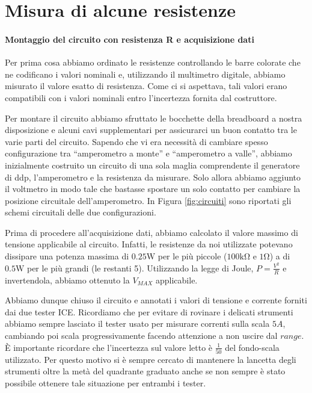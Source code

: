 \section{Misura di alcune resistenze}
\paragraph{Montaggio del circuito con resistenza R e acquisizione dati\\}
Per prima cosa abbiamo ordinato le resistenze controllando le barre colorate che ne codificano  i valori nominali e, utilizzando il multimetro digitale, abbiamo misurato il valore esatto di resistenza. Come ci si aspettava, tali valori erano compatibili con i valori nominali entro l'incertezza fornita dal costruttore.

Per montare il circuito abbiamo sfruttato le bocchette della breadboard a nostra disposizione e alcuni cavi supplementari per assicurarci un buon contatto tra le varie parti del circuito.
Sapendo che vi era necessità di cambiare spesso configurazione tra ``amperometro a monte'' e ``amperometro a valle'', abbiamo inizialmente costruito un circuito di una sola maglia comprendente il generatore di ddp, l'amperometro e la resistenza da misurare. 
Solo allora abbiamo aggiunto il voltmetro in modo tale che bastasse spostare un solo contatto per cambiare la posizione circuitale dell'amperometro. In Figura \ref{fig:circuiti} sono riportati gli schemi circuitali delle due configurazioni.

Prima di procedere all'acquisizione dati, abbiamo calcolato il valore massimo di tensione applicabile al circuito. Infatti, le resistenze da noi utilizzate potevano dissipare una potenza massima di $0.25\si{\watt}$ per le più piccole ($100 \si{\kilo\ohm}$ e $1\si{\ohm}$) a di $0.5\si{\watt}$ per le più grandi (le restanti 5). Utilizzando la legge di Joule, $P=\frac{V^2}{R}$ e invertendola, abbiamo ottenuto la $V_{MAX}$ applicabile. %

Abbiamo dunque chiuso il circuito e annotati i valori di tensione e corrente forniti dai due tester ICE. Ricordiamo che per evitare di rovinare i delicati strumenti abbiamo sempre lasciato il tester usato per misurare correnti sulla scala $5A$, cambiando poi scala progressivamente facendo attenzione a non uscire dal $range$. È importante ricordare che l'incertezza sul valore letto è $\frac{1}{50}$ del fondo-scala utilizzato. Per questo motivo si è sempre cercato di mantenere la lancetta degli strumenti oltre la metà del quadrante graduato anche se non sempre è stato possibile ottenere tale situazione per entrambi i tester.

